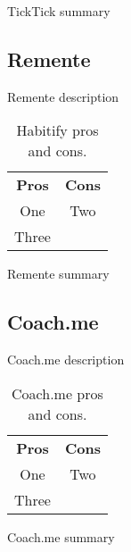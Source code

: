 TickTick summary


\subsection{Remente}\label{subsec:remente}

Remente description

\begin{table}[h!]
    \centering
    \begin{ctucolortab}
        \begin{tabular}{cc}
            \bfseries Pros & \bfseries Cons\\\Midrule
            One & Two\\
            Three & \\
        \end{tabular}
    \end{ctucolortab}
    \caption{Habitify pros and cons.}\label{tab:remente-pros-cons}
\end{table}

Remente summary


\subsection{Coach.me}\label{subsec:coachme}

Coach.me description

\begin{table}[h!]
    \centering
    \begin{ctucolortab}
        \begin{tabular}{cc}
            \bfseries Pros & \bfseries Cons\\\Midrule
            One & Two\\
            Three & \\
        \end{tabular}
    \end{ctucolortab}
    \caption{Coach.me pros and cons.}\label{tab:coachme-pros-cons}
\end{table}

Coach.me summary